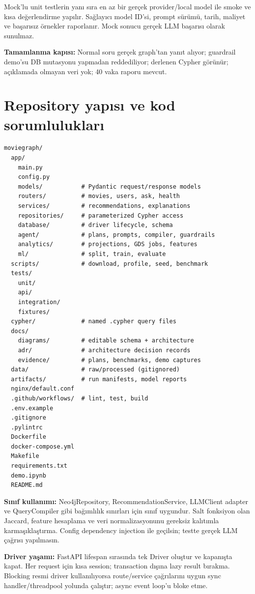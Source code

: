 \documentclass[11pt,a4paper]{article}
\newcommand{\gate}[1]{\par\smallskip\noindent\colorbox{pale}{\parbox{0.96\linewidth}{\textbf{Tamamlanma kapısı:} #1}}\par\smallskip}
\begin{document}
Mock'lu unit testlerin yanı sıra en az bir gerçek provider/local model ile smoke ve kısa değerlendirme yapılır. Sağlayıcı model ID'si, prompt sürümü, tarih, maliyet ve başarısız örnekler raporlanır. Mock sonucu gerçek LLM başarısı olarak sunulmaz.

\gate{Normal soru gerçek graph'tan yanıt alıyor; guardrail demo'su DB mutasyonu yapmadan reddediliyor; derlenen Cypher görünür; açıklamada olmayan veri yok; 40 vaka raporu mevcut.}

\section{Repository yapısı ve kod sorumlulukları}
\begin{lstlisting}
moviegraph/
  app/
    main.py
    config.py
    models/           # Pydantic request/response models
    routers/          # movies, users, ask, health
    services/         # recommendations, explanations
    repositories/     # parameterized Cypher access
    database/         # driver lifecycle, schema
    agent/            # plans, prompts, compiler, guardrails
    analytics/        # projections, GDS jobs, features
    ml/               # split, train, evaluate
  scripts/            # download, profile, seed, benchmark
  tests/
    unit/
    api/
    integration/
    fixtures/
  cypher/             # named .cypher query files
  docs/
    diagrams/         # editable schema + architecture
    adr/              # architecture decision records
    evidence/         # plans, benchmarks, demo captures
  data/               # raw/processed (gitignored)
  artifacts/          # run manifests, model reports
  nginx/default.conf
  .github/workflows/  # lint, test, build
  .env.example
  .gitignore
  .pylintrc
  Dockerfile
  docker-compose.yml
  Makefile
  requirements.txt
  demo.ipynb
  README.md
\end{lstlisting}

\textbf{Sınıf kullanımı:} Neo4jRepository, RecommendationService, LLMClient adapter ve QueryCompiler gibi bağımlılık sınırları için sınıf uygundur. Salt fonksiyon olan Jaccard, feature hesaplama ve veri normalizasyonunu gereksiz kalıtımla karmaşıklaştırma. Config dependency injection ile geçilsin; testte gerçek LLM çağrısı yapılmasın.

\textbf{Driver yaşamı:} FastAPI lifespan sırasında tek Driver oluştur ve kapanışta kapat. Her request için kısa session; transaction dışına lazy result bırakma. Blocking resmi driver kullanılıyorsa route/service çağrılarını uygun sync handler/threadpool yolunda çalıştır; async event loop'u bloke etme.
\end{document}

